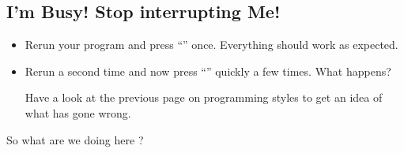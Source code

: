 \documentclass{coderdojo}
\begin{document}
\clearpage

\subsection{I'm Busy! Stop interrupting Me!} 

\begin{itemize}
\item[\todoSymbol] \color{todo}
Rerun your  program and press ``'' once. Everything should work as expected.
\item[\todoSymbol] \color{todo}
Rerun  a second time and now press  ``''  quickly a few times. What happens?

Have a look at the previous page on programming styles to get an idea of what has gone wrong. 
\end{itemize}


So what are we doing here ?
\end{document}
